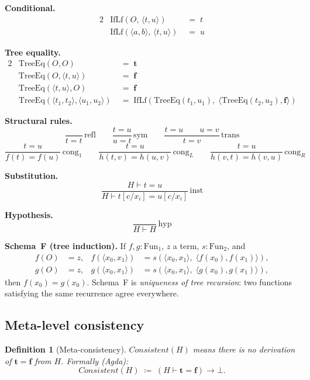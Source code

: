 \documentclass[11pt]{article}
\newtheorem{definition}[theorem]{Definition}
\newcommand{\pair}[2]{\langle #1, #2 \rangle}
\newcommand{\trueT}{\mathbf{t}}
\newcommand{\falseT}{\mathbf{f}}
\newcommand{\SchemaF}{\textbf{Schema~F}}
\newcommand{\TreeEq}{\mathrm{TreeEq}}
\newcommand{\IfLf}{\mathrm{IfLf}}
\begin{document}
\textbf{Conditional.}
\begin{alignat*}{2}
  &\IfLf(O,\, \pair{t}{u}) &\;=\; t \\
  &\IfLf(\pair{a}{b},\, \pair{t}{u}) &\;=\; u
\end{alignat*}

\textbf{Tree equality.}
\begin{alignat*}{2}
  &\TreeEq(O, O) &\;=\; \trueT \\
  &\TreeEq(O, \pair{t}{u}) &\;=\; \falseT \\
  &\TreeEq(\pair{t}{u}, O) &\;=\; \falseT \\
  &\TreeEq(\pair{t_1}{t_2}, \pair{u_1}{u_2})
    &\;=\; \IfLf(\TreeEq(t_1, u_1),\; \pair{\TreeEq(t_2, u_2)}{\falseT})
\end{alignat*}

\textbf{Structural rules.}
\[
  \frac{}{t = t}\,\text{refl} \qquad
  \frac{t = u}{u = t}\,\text{sym} \qquad
  \frac{t = u \qquad u = v}{t = v}\,\text{trans}
\]
\[
  \frac{t = u}{f(t) = f(u)}\,\text{cong}_1 \qquad
  \frac{t = u}{h(t, v) = h(u, v)}\,\text{cong}_L \qquad
  \frac{t = u}{h(v, t) = h(v, u)}\,\text{cong}_R
\]

\textbf{Substitution.}
\[
  \frac{H \vdash t = u}
       {H \vdash t[c/x_i] = u[c/x_i]}\,\text{inst}
\]

\textbf{Hypothesis.}
\[
  \frac{}{H \vdash H}\,\text{hyp}
\]

\textbf{\SchemaF{} (tree induction).}
If $f, g : \mathrm{Fun}_1$, $z$ a term, $s : \mathrm{Fun}_2$, and
\begin{align*}
  f(O) &= z, & f(\pair{x_0}{x_1}) &= s(\pair{x_0}{x_1},\; \pair{f(x_0)}{f(x_1)}), \\
  g(O) &= z, & g(\pair{x_0}{x_1}) &= s(\pair{x_0}{x_1},\; \pair{g(x_0)}{g(x_1)}),
\end{align*}
then $f(x_0) = g(x_0)$.  Schema~F is \emph{uniqueness of tree
recursion}: two functions satisfying the same recurrence agree
everywhere.

\subsection{Meta-level consistency}

\begin{definition}[Meta-consistency]
$\mathit{Consistent}(H)$ means there is no derivation of
$\trueT = \falseT$ from $H$.  Formally (Agda):
\[
  \mathit{Consistent}(H) \;\coloneqq\; (H \vdash \trueT = \falseT) \to \bot.
\]
\end{definition}
\end{document}
